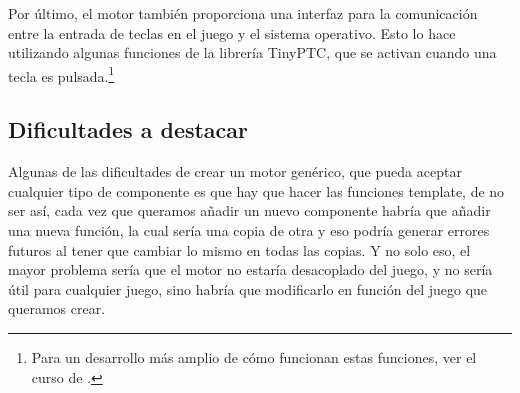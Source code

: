 Por último, el motor también proporciona una interfaz para la comunicación entre la entrada de teclas en el juego y el sistema operativo. Esto lo hace utilizando algunas funciones de la librería TinyPTC, que se activan cuando una tecla es pulsada.\footnote{Para un desarrollo más amplio de cómo funcionan estas funciones, ver el curso de \citep{CursoMotorC++}.}

\subsection{Dificultades a destacar}
Algunas de las dificultades de crear un motor genérico, que pueda aceptar cualquier tipo de componente es que hay que hacer las funciones template, de no ser así, cada vez que queramos añadir un nuevo componente habría que añadir una nueva función, la cual sería una copia de otra y eso podría generar errores futuros al tener que cambiar lo mismo en todas las copias. Y no solo eso, el mayor problema sería que el motor no estaría desacoplado del juego, y no sería útil para cualquier juego, sino habría que modificarlo en función del juego que queramos crear.

